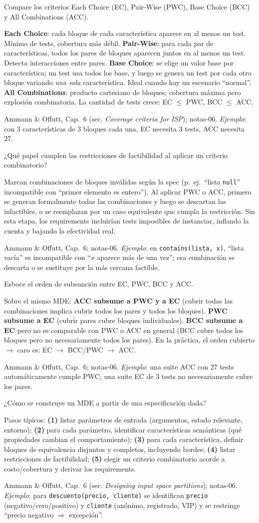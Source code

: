 \documentclass[11pt,a4paper]{article}
\newcounter{preg}
\newcommand{\qa}[3]{%
  \stepcounter{preg}%
  \vspace{0.4em}
  \begin{preguntabox}{\thepreg}
  #1
  \end{preguntabox}
  \begin{respuestabox}
  #2
  \end{respuestabox}
  \begin{refbox}
  #3
  \end{refbox}
  \vspace{0.6em}
}
\begin{document}
\qa{Compare los criterios Each Choice (EC), Pair-Wise (PWC), Base Choice (BCC) y All Combinations (ACC).}
{\textbf{Each Choice}: cada bloque de cada característica aparece en al menos un test. Mínimo de tests, cobertura más débil. \textbf{Pair-Wise}: para cada par de características, todos los pares de bloques aparecen juntos en al menos un test. Detecta interacciones entre pares. \textbf{Base Choice}: se elige un valor base por característica; un test usa todos los base, y luego se genera un test por cada otro bloque variando \emph{una sola} característica. Ideal cuando hay un escenario ``normal''. \textbf{All Combinations}: producto cartesiano de bloques; cobertura máxima pero explosión combinatoria. La cantidad de tests crece: EC $\leq$ PWC, BCC $\leq$ ACC.}
{Ammann \& Offutt, Cap.~6 (sec. \emph{Coverage criteria for ISP}); notas-06. \emph{Ejemplo}: con 3 características de 3 bloques cada una, EC necesita 3 tests, ACC necesita 27.}

\qa{¿Qué papel cumplen las restricciones de factibilidad al aplicar un criterio combinatorio?}
{Marcan combinaciones de bloques inválidas según la spec (p.~ej.\ ``lista \texttt{null}'' incompatible con ``primer elemento es entero''). Al aplicar PWC o ACC, primero se generan formalmente todas las combinaciones y luego se descartan las infactibles, o se reemplazan por un caso equivalente que cumpla la restricción. Sin esta etapa, los requirements incluirían tests imposibles de instanciar, inflando la cuenta y bajando la efectividad real.}
{Ammann \& Offutt, Cap.~6; notas-06. \emph{Ejemplo}: en \texttt{contains(lista, x)}, ``lista vacía'' es incompatible con ``$x$ aparece más de una vez''; esa combinación se descarta o se sustituye por la más cercana factible.}

\qa{Esboce el orden de subsunción entre EC, PWC, BCC y ACC.}
{Sobre el mismo MDE: \textbf{ACC subsume a PWC y a EC} (cubrir todas las combinaciones implica cubrir todos los pares y todos los bloques). \textbf{PWC subsume a EC} (cubrir pares cubre bloques individuales). \textbf{BCC subsume a EC} pero no es comparable con PWC o ACC en general (BCC cubre todos los bloques pero no necesariamente todos los pares). En la práctica, el orden cubierto $\to$ caro es: EC $\to$ BCC/PWC $\to$ ACC.}
{Ammann \& Offutt, Cap.~6; notas-06. \emph{Ejemplo}: una suite ACC con 27 tests automáticamente cumple PWC; una suite EC de 3 tests no necesariamente cubre los pares.}

\qa{¿Cómo se construye un MDE a partir de una especificación dada?}
{Pasos típicos: \textbf{(1)} listar parámetros de entrada (argumentos, estado relevante, entorno); \textbf{(2)} para cada parámetro, identificar características semánticas (qué propiedades cambian el comportamiento); \textbf{(3)} para cada característica, definir bloques de equivalencia disjuntos y completos, incluyendo bordes; \textbf{(4)} listar restricciones de factibilidad; \textbf{(5)} elegir un criterio combinatorio acorde a costo/cobertura y derivar los requirements.}
{Ammann \& Offutt, Cap.~6 (sec. \emph{Designing input space partitions}); notas-06. \emph{Ejemplo}: para \texttt{descuento(precio, cliente)} se identifican \texttt{precio} (negativo/cero/positivo) y \texttt{cliente} (anónimo, registrado, VIP) y se restringe ``precio negativo $\Rightarrow$ excepción''.}
\end{document}
